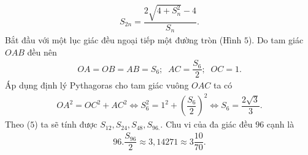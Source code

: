 \begin{multicols}{2}
\begin{align*}
		{S_{2n}} = \dfrac{{2\sqrt {4 + S_n^2}  - 4}}{{{S_n}}}. \tag{$5$}
	\end{align*}
	Bắt đầu với một lục giác đều ngoại tiếp một đường tròn (Hình $5$).  Do tam giác  $OAB$ đều nên 
	\begin{align*}
		OA = OB = AB = {S_6};\;\;AC = \dfrac{{{S_6}}}{2};\;\;OC = 1.
	\end{align*}
	Áp dụng định lý Pythagoras cho tam giác vuông $OAC$ ta có
	\begin{align*}
		O{A^2} = O{C^2} + A{C^2} \Leftrightarrow S_6^2 = {1^2} + {(\dfrac{{{S_6}}}{2})^2} \Leftrightarrow {S_6} = \dfrac{{2\sqrt 3 }}{3}.
	\end{align*}
	Theo ($5$) ta sẽ tính được ${S_{12}},{S_{24}},{S_{48}},{S_{96.}}$.
	Chu vi của đa giác đều $96$ cạnh là  
	\begin{align*}
		96.\dfrac{{{S_{96}}}}{2} \approx 3,14271 \approx 3\dfrac{{10}}{{70}}.
	\end{align*}


\end{multicols}
